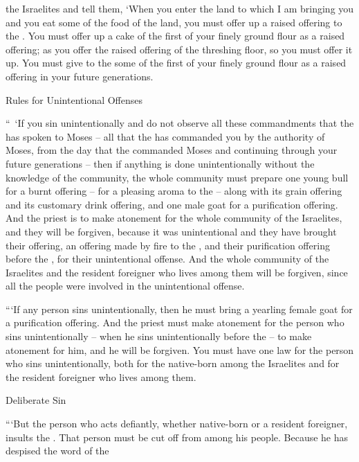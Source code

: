 {the Israelites
and tell
them,
‘When you enter
the land
to which
I am
bringing you
and you eat
some of the food
of the land,
you must offer
up a raised
offering to the
{}.
You must offer up
a cake
of the first
of your finely ground flour
as a raised offering;
as you offer the raised offering
of the threshing floor,
so
you must offer
it up.
You must give
to the
{}
some of the first
of your finely ground flour
as a raised offering
in your future generations.
\par }{\SH Rules for Unintentional Offenses
\par }{\PP {}“ ‘If
you sin unintentionally
and do not
observe
all
these
commandments
that
the {}
has spoken
to
Moses –
all
that
the {}
has
commanded
you by the authority
of Moses,
from
the day
that
the {}
commanded
Moses and continuing
through your future generations –
then
if
anything is done
unintentionally
without the knowledge
of the community,
the whole
community
must prepare
one
young
bull
for a burnt offering
– for a pleasing
aroma
to the
{} –
along with its grain offering
and its customary
drink offering,
and one
male
goat
for a purification offering.
And the priest
is to make atonement
for the whole
community
of the Israelites,
and they will be forgiven,
because
it was unintentional
and they
have brought
their offering,
an offering made by fire
to the
{}, and their purification
offering before
the {}, for their unintentional offense.
And the whole
community
of the Israelites
and the resident foreigner
who lives
among
them will be forgiven,
since
all
the people
were involved in the unintentional offense.
\par }{\PP {}“‘If
any
person
sins
unintentionally,
then he must bring
a yearling
female
goat
for a purification offering.
And the priest
must make atonement
for
the person
who sins unintentionally
– when he sins
unintentionally
before
the {} –
to make atonement
for
him, and he will be forgiven.
You must have
one
law
for the person who sins
unintentionally,
both for the native-born
among
the Israelites
and for the resident foreigner
who lives
among them.
\par }{\SH Deliberate Sin
\par }{\PP {}“‘But the person
who
acts defiantly,
whether native-born
or a resident foreigner,
insults
the {}. That person must be cut off
from among
his people.
Because
he has despised
the word
of the {}
}
